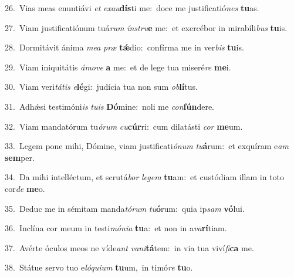 {\numbfont\textcolor{\numbcolor}{26.}}~Vias meas enuntiávi \textit{et} \textit{ex}\-\textit{au}\textbf{dís}ti me:~\star doce me justificatió\textit{nes} \textbf{tu}\-as.\par
{\numbfont\textcolor{\numbcolor}{27.}}~Viam justificatiónum tuá\textit{rum} \textit{ín}\-\textit{stru}\textbf{e} me:~\star et exercébor in mirabíli\textit{bus} \textbf{tu}\-is.\par
{\numbfont\textcolor{\numbcolor}{28.}}~Dormitávit ánima \textit{me}\-\textit{a} \textit{præ} \textbf{tǽ}\-dio:~\star confírma me in ver\textit{bis} \textbf{tu}\-is.\par
{\numbfont\textcolor{\numbcolor}{29.}}~Viam iniquitátis \textit{á}\-\textit{mo}\textit{ve} \textbf{a} me:~\star et de lege tua miseré\textit{re} \textbf{me}\-i.\par
{\numbfont\textcolor{\numbcolor}{30.}}~Viam veri\-\textit{tá}\-\textit{tis} \textit{e}\-\textbf{lé}gi:~\star judícia tua non sum \textit{ob}\-\textbf{lí}tus.\par
{\numbfont\textcolor{\numbcolor}{31.}}~Adhǽsi testimóni\textit{is} \textit{tu}\-\textit{is} \textbf{Dó}\-mine:~\star noli me \textit{con}\-\textbf{fún}dere.\par
{\numbfont\textcolor{\numbcolor}{32.}}~Viam mandatórum tu\-\textit{ó}\-\textit{rum} \textit{cu}\-\textbf{cúr}ri:~\star cum dilatásti \textit{cor} \textbf{me}\-um.\par
{\numbfont\textcolor{\numbcolor}{33.}}~Legem pone mihi, Dómine, viam justificati\-\textit{ó}\-\textit{num} \textit{tu}\-\textbf{á}rum:~\star et exquíram e\textit{am} \textbf{sem}\-per.\par
{\numbfont\textcolor{\numbcolor}{34.}}~Da mihi intelléctum, et scrutá\textit{bor} \textit{le}\-\textit{gem} \textbf{tu}\-am:~\star et custódiam illam in toto cor\textit{de} \textbf{me}\-o.\par
{\numbfont\textcolor{\numbcolor}{35.}}~Deduc me in sémitam manda\-\textit{tó}\-\textit{rum} \textit{tu}\-\textbf{ó}rum:~\star quia ip\textit{sam} \textbf{vó}\-lui.\par
{\numbfont\textcolor{\numbcolor}{36.}}~Inclína cor meum in testi\-\textit{mó}\-\textit{ni}\textit{a} \textbf{tu}\-a:~\star et non in a\-\textit{va}\-\textbf{rí}tiam.\par
{\numbfont\textcolor{\numbcolor}{37.}}~Avérte óculos meos ne víde\textit{ant} \textit{va}\-\textit{ni}\textbf{tá}tem:~\star in via tua viví\-\textit{fi}\-\textbf{ca} me.\par
{\numbfont\textcolor{\numbcolor}{38.}}~Státue servo tuo e\-\textit{ló}\-\textit{qui}\textit{um} \textbf{tu}\-um,~\star in timó\textit{re} \textbf{tu}\-o.\par
